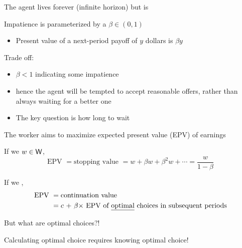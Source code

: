 \begin{frame}

    The agent lives forever (infinite horizon) but is 

            \vspace{0.5em}
    Impatience is parameterized by a  $\beta \in (0, 1)$

            \vspace{0.5em}
    \begin{itemize}
        \item Present value of a next-period payoff of $y$ dollars is $\beta y$
    \end{itemize}

            \vspace{0.5em}
            \vspace{0.5em}
    Trade off:
    \begin{itemize}
        \item $\beta < 1$ indicating some impatience
            \vspace{0.5em}
        \item hence the agent will be
            tempted to accept reasonable offers, rather than always waiting
            for a better one
            \vspace{0.5em}
        \item The key question is how long to wait
    \end{itemize}
   
\end{frame}



\begin{frame}
    
    The worker aims to maximize expected present value (EPV) of earnings

        \vspace{0.4em}
    If we  $w \in \mathsf W$,
    \begin{equation*}
        \text{EPV }
        = \text{stopping value }
        = w + \beta w + \beta^2 w + \cdots 
        = \frac{w}{1 - \beta}
    \end{equation*}

        \vspace{0.4em}
    If we ,
    \begin{align*}
        \text{EPV }
        & = \text{continuation value }
        \\
        & = \text{$c$ + $\beta \times$ EPV of 
        \underline{optimal} choices in subsequent periods}
    \end{align*}

        \vspace{0.4em}
    But what are optimal choices?!
        \vspace{0.4em}

    Calculating optimal choice requires knowing optimal choice!

\end{frame}

